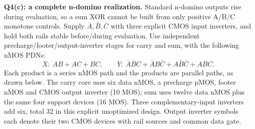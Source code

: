 \documentclass[10pt]{article}
\begin{document}
\newpage\textbf{Q4(c): a complete n-domino realization.} Standard n-domino outputs rise during evaluation, so a sum XOR cannot be built from only positive A/B/C monotone controls. Supply $\bar A,\bar B,\bar C$ with three explicit CMOS input inverters, and hold both rails stable before/during evaluation. Use independent precharge/footer/output-inverter stages for carry and sum, with the following nMOS PDNs:
\[X:\ AB+AC+BC,\qquad Y:\ \bar A\bar BC+\bar AB\bar C+A\bar B\bar C+ABC.\]
Each product is a series nMOS path and the products are parallel paths, as drawn below. The carry core uses six data nMOS, a precharge pMOS, footer nMOS and CMOS output inverter (10 MOS); sum uses twelve data nMOS plus the same four support devices (16 MOS). Three complementary-input inverters add six, total 32 in this explicit unoptimized design. Output inverter symbols each denote their two CMOS devices with rail sources and common data gate.
\end{document}
